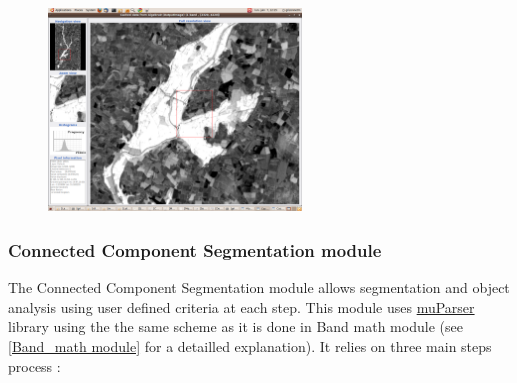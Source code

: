 \begin{figure}
  \center
  \includegraphics[width=0.6\textwidth]{../Art/MonteverdiImages/monteverdi_NDWI2_substraction.png}
  \label{fig:ndwi2}
\end{figure}


\subsubsection{Connected Component Segmentation module}

The Connected Component Segmentation module allows segmentation and object analysis using user defined criteria at each step. This module uses \href{http://muparser.sourceforge.net/}{muParser} library using the the same scheme as it is done in Band math module (see \ref{Band_math module} for a detailled explanation). It relies on three main steps process :

